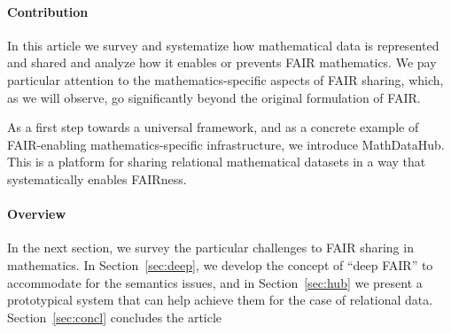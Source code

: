 \paragraph{Contribution}
In this article we survey and systematize how mathematical data is represented and shared and analyze how it enables or prevents FAIR mathematics.
We pay particular attention to the mathematics-specific aspects of FAIR sharing, which, as we will observe, go significantly beyond the original formulation of FAIR.

As a first step towards a universal framework, and as a concrete example of FAIR-enabling mathematics-specific infrastructure, we introduce MathDataHub.
This is a platform for sharing relational mathematical datasets in a way that systematically enables FAIRness.

\paragraph{Overview}
In the next section, we survey the particular challenges to FAIR sharing in mathematics.
In Section~\ref{sec:deep}, we develop the concept of ``deep FAIR'' to accommodate for the semantics issues, and in Section~\ref{sec:hub} we present a prototypical system that can help achieve them for the case of relational data.
Section~\ref{sec:concl} concludes the article

